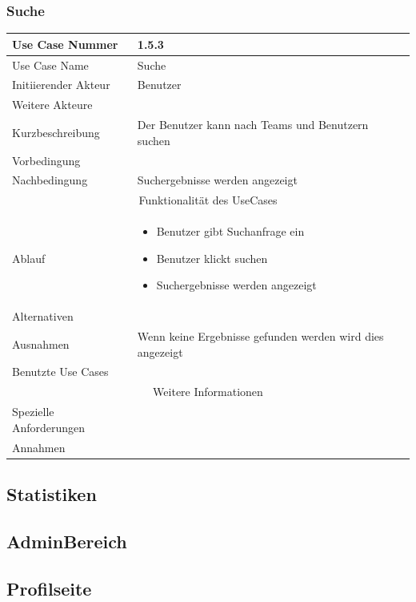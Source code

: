 \documentclass[10pt,a4paper]{article}
\begin{document}
		\subsubsection{Suche}
				\begin{tabular}{|l|p{.5\linewidth}|}
				\hline Use Case Nummer & 1.5.3 \\ 
				\hline Use Case Name & Suche \\ 
				\hline Initiierender Akteur & Benutzer \\
				\hline Weitere Akteure &  \\
				\hline Kurzbeschreibung & Der Benutzer kann nach Teams und Benutzern suchen \\
				\hline Vorbedingung &  \\
				\hline Nachbedingung & Suchergebnisse werden angezeigt \\
				\hline \multicolumn{2}{|c|}{Funktionalität des UseCases}\\
				\hline Ablauf & \begin{itemize}
					\item Benutzer gibt Suchanfrage ein
					\item Benutzer klickt suchen
					\item Suchergebnisse werden angezeigt
				\end{itemize} \\
				\hline Alternativen &  \\
				\hline Ausnahmen & Wenn keine Ergebnisse gefunden werden wird dies angezeigt \\
				\hline Benutzte Use Cases &  \\
				\hline \multicolumn{2}{|c|}{Weitere Informationen} \\
				\hline Spezielle Anforderungen &  \\
				\hline Annahmen &  \\
				\hline
				\end{tabular}
\subsection{Statistiken}
\subsection{AdminBereich}
\subsection{Profilseite}
\end{document}
